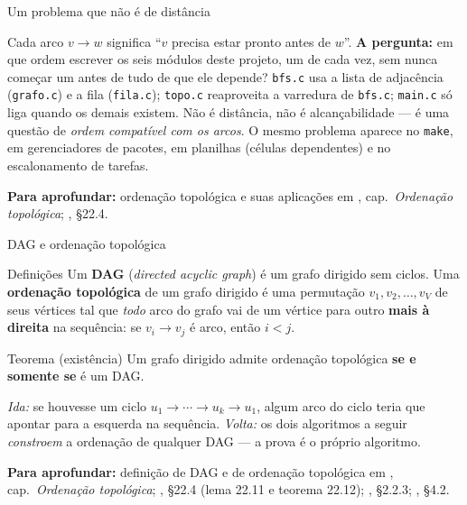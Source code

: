 \documentclass[aspectratio=169]{beamer}
\newcommand{\fonte}[1]{%
  \vfill
  {\tiny\color{gray!55!black}\textbf{Para aprofundar:} #1\par}%
}
\begin{document}
\begin{frame}{Um problema que não é de distância}
  \begin{center}
  \end{center}
  {\small Cada arco $v \to w$ significa ``$v$ precisa estar pronto antes de $w$''.}
  \medskip
  {\scriptsize \textbf{A pergunta:} em que ordem escrever os seis módulos deste
  projeto, um de cada vez, sem nunca começar um antes de tudo de que ele depende?
  \texttt{bfs.c} usa a lista de adjacência (\texttt{grafo.c}) e a fila
  (\texttt{fila.c}); \texttt{topo.c} reaproveita a varredura de \texttt{bfs.c};
  \texttt{main.c} só liga quando os demais existem. Não é distância, não é
  alcançabilidade --- é uma questão de \emph{ordem compatível com os arcos}. O
  mesmo problema aparece no \texttt{make}, em gerenciadores de pacotes, em
  planilhas (células dependentes) e no escalonamento de tarefas.}
  \fonte{ordenação topológica e suas aplicações em
  \cite{feofiloff2020algoritmos}, cap.\ \emph{Ordenação topológica};
  \cite{cormen2009introduction}, §22.4.}
\end{frame}

\begin{frame}{DAG e ordenação topológica}
  \begin{block}{Definições}
    {\small Um \textbf{DAG} (\emph{directed acyclic graph}) é um grafo dirigido
    sem ciclos. Uma \textbf{ordenação topológica} de um grafo dirigido é uma
    permutação $v_1, v_2, \ldots, v_V$ de seus vértices tal que
    \emph{todo} arco do grafo vai de um vértice para outro \textbf{mais à
    direita} na sequência: se $v_i \to v_j$ é arco, então $i < j$.}
  \end{block}
  \begin{exampleblock}{Teorema (existência)}
    {\small Um grafo dirigido admite ordenação topológica
    \textbf{se e somente se} é um DAG.}
  \end{exampleblock}
  {\scriptsize \emph{Ida:} se houvesse um ciclo $u_1 \to \cdots \to u_k \to u_1$,
  algum arco do ciclo teria que apontar para a esquerda na sequência.
  \emph{Volta:} os dois algoritmos a seguir \emph{constroem} a ordenação de
  qualquer DAG --- a prova é o próprio algoritmo.}
  \fonte{definição de DAG e de ordenação topológica em \cite{feofiloff2020algoritmos}, cap.\ \emph{Ordenação topológica};
  \cite{cormen2009introduction}, §22.4 (lema 22.11 e teorema 22.12);
  \cite{knuth1997art}, §2.2.3; \cite{levitin2012introduction}, §4.2.}
\end{frame}
\end{document}
